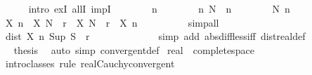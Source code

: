\begin{isabellebody}
\ \ \ \ \isamarkupfalse%
\ {\isacharparenleft}{\kern0pt}intro\ exI\ allI\ impI{\isacharparenright}{\kern0pt}\isanewline
\ \ \ \ \ \ \isamarkupfalse%
\ n\isanewline
\ \ \ \ \ \ \isamarkupfalse%
\ n{\isacharcolon}{\kern0pt}\ {\isachardoublequoteopen}N\ {\isasymle}\ n{\isachardoublequoteclose}\isanewline
\ \ \ \ \ \ \isamarkupfalse%
\ N\ n\ \isamarkupfalse%
\ {\isachardoublequoteopen}X\ n\ {\isacharless}{\kern0pt}\ X\ N\ {\isacharplus}{\kern0pt}\ r{\isacharslash}{\kern0pt}{}{\isachardoublequoteclose}\ \ {\isachardoublequoteopen}X\ N\ {\isacharminus}{\kern0pt}\ r{\isacharslash}{\kern0pt}{}\ {\isacharless}{\kern0pt}\ X\ n{\isachardoublequoteclose}\isanewline
\ \ \ \ \ \ \ \ \isamarkupfalse%
\ simp{\isacharunderscore}{\kern0pt}all\isanewline
\ \ \ \ \ \ \isamarkupfalse%
\ \isamarkupfalse%
\ {\isachardoublequoteopen}dist\ {\isacharparenleft}{\kern0pt}X\ n{\isacharparenright}{\kern0pt}\ {\isacharparenleft}{\kern0pt}Sup\ S{\isacharparenright}{\kern0pt}\ {\isacharless}{\kern0pt}\ r{\isachardoublequoteclose}\ \isamarkupfalse%
\ {}\ {}\isanewline
\ \ \ \ \ \ \ \ \isamarkupfalse%
\ {\isacharparenleft}{\kern0pt}simp\ add{\isacharcolon}{\kern0pt}\ abs{\isacharunderscore}{\kern0pt}diff{\isacharunderscore}{\kern0pt}less{\isacharunderscore}{\kern0pt}iff\ dist{\isacharunderscore}{\kern0pt}real{\isacharunderscore}{\kern0pt}def{\isacharparenright}{\kern0pt}\isanewline
\ \ \ \ \isamarkupfalse%
\isanewline
\ \ \isamarkupfalse%
\isanewline
\ \ \isamarkupfalse%
\ \isamarkupfalse%
\ {\isacharquery}{\kern0pt}thesis\ \isamarkupfalse%
\ {\isacharparenleft}{\kern0pt}auto\ simp{\isacharcolon}{\kern0pt}\ convergent{\isacharunderscore}{\kern0pt}def{\isacharparenright}{\kern0pt}\isanewline
{}\isamarkupfalse%
%
\endisatagproof
{\isafoldproof}%
%
\isadelimproof
\isanewline
%
\endisadelimproof
\isanewline
{}\isamarkupfalse%
\ real\ {\isacharcolon}{\kern0pt}{\isacharcolon}{\kern0pt}\ complete{\isacharunderscore}{\kern0pt}space\isanewline
%
\isadelimproof
\ \ %
\endisadelimproof
%
\isatagproof
{}\isamarkupfalse%
\ intro{\isacharunderscore}{\kern0pt}classes\ {\isacharparenleft}{\kern0pt}rule\ real{\isacharunderscore}{\kern0pt}Cauchy{\isacharunderscore}{\kern0pt}convergent{\isacharparenright}{\kern0pt}%
\endisatagproof
{\isafoldproof}%
%
\isadelimproof

\end{isabellebody}
